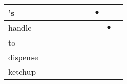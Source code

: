 \documentclass[landscape]{article}
\newcommand{\ssp}{\hspace{2pt}}
\newcommand{\mex}{\cellcolor{g}$\bullet$}
\begin{document}
\begin{tabular}{|l|p{10pt}|p{10pt}|p{10pt}|p{10pt}|p{10pt}|p{10pt}|p{10pt}|p{10pt}|p{10pt}|}
\hline
\ssp \cellcolor{ref6}'s \ssp&\hspace{2pt}&\hspace{2pt}&\hspace{2pt}&\hspace{2pt}&\hspace{2pt}&\hspace{2pt}&\hspace{2pt}\mex&\hspace{2pt}&\hspace{2pt}\\
\hline
\ssp \cellcolor{ref7}handle \ssp&\hspace{2pt}&\hspace{2pt}&\hspace{2pt}&\hspace{2pt}&\hspace{2pt}&\hspace{2pt}&\hspace{2pt}&\hspace{2pt}\mex&\hspace{2pt}\\
\hline
\ssp to \ssp&\hspace{2pt}&\hspace{2pt}&\hspace{2pt}&\hspace{2pt}&\hspace{2pt}&\hspace{2pt}&\hspace{2pt}&\hspace{2pt}&\hspace{2pt}\\
\hline
\ssp dispense \ssp&\hspace{2pt}&\hspace{2pt}&\hspace{2pt}&\hspace{2pt}&\hspace{2pt}&\hspace{2pt}&\hspace{2pt}&\hspace{2pt}&\hspace{2pt}\\
\hline
\ssp ketchup \ssp&\hspace{2pt}&\hspace{2pt}&\hspace{2pt}&\hspace{2pt}&\hspace{2pt}&\hspace{2pt}&\hspace{2pt}&\hspace{2pt}&\hspace{2pt}\\

\end{tabular}
\end{document}
